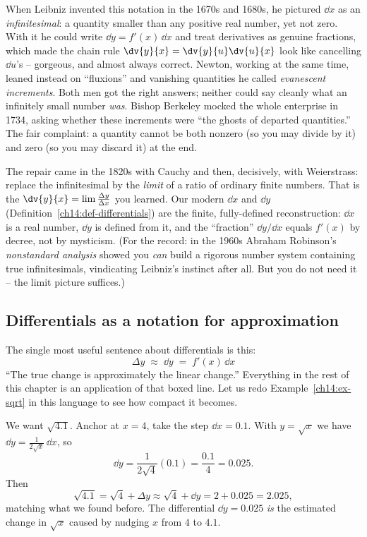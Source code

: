 \begin{historybox}
When Leibniz invented this notation in the 1670s and 1680s, he pictured $\dd x$ as
an \emph{infinitesimal}: a quantity smaller than any positive real number, yet not
zero. With it he could write $\dd y = f'(x)\,\dd x$ and treat derivatives as
genuine fractions, which made the chain rule $\dv{y}{x}=\dv{y}{u}\dv{u}{x}$ look
like cancelling $\dd u$'s -- gorgeous, and almost always correct. Newton,
working at the same time, leaned instead on ``fluxions'' and vanishing quantities
he called \emph{evanescent increments}. Both men got the right answers; neither
could say cleanly what an infinitely small number \emph{was}. Bishop Berkeley
mocked the whole enterprise in 1734, asking whether these increments were ``the
ghosts of departed quantities.'' The fair complaint: a quantity cannot be both
nonzero (so you may divide by it) and zero (so you may discard it) at the end.

The repair came in the 1820s with Cauchy and then, decisively, with Weierstrass:
replace the infinitesimal by the \emph{limit} of a ratio of ordinary finite
numbers. That is the $\dv{y}{x}=\lim \frac{\Delta y}{\Delta x}$ you learned. Our
modern $\dd x$ and $\dd y$ (Definition~\ref{ch14:def-differentials}) are the
finite, fully-defined reconstruction: $\dd x$ is a real number, $\dd y$ is defined
from it, and the ``fraction'' $\dd y/\dd x$ equals $f'(x)$ by decree, not by
mysticism. (For the record: in the 1960s Abraham Robinson's \emph{nonstandard
analysis} showed you \emph{can} build a rigorous number system containing true
infinitesimals, vindicating Leibniz's instinct after all. But you do not need it
-- the limit picture suffices.)
\end{historybox}

\subsection{Differentials as a notation for approximation}

The single most useful sentence about differentials is this:
\[
\boxed{\;\Delta y \;\approx\; \dd y \;=\; f'(x)\,\dd x\;}
\]
``The true change is approximately the linear change.'' Everything in the rest of
this chapter is an application of that boxed line. Let us redo
Example~\ref{ch14:ex-sqrt} in this language to see how compact it becomes.

\begin{example}
\label{ch14:ex-sqrt-diff}
We want $\sqrt{4.1}$. Anchor at $x=4$, take the step $\dd x = 0.1$. With
$y=\sqrt{x}$ we have $\dd y = \frac{1}{2\sqrt{x}}\,\dd x$, so
\[
\dd y = \frac{1}{2\sqrt 4}(0.1) = \frac{0.1}{4} = 0.025.
\]
Then
\[
\sqrt{4.1} = \sqrt 4 + \Delta y \approx \sqrt 4 + \dd y = 2 + 0.025 = 2.025,
\]
matching what we found before. The differential $\dd y=0.025$ \emph{is} the
estimated change in $\sqrt{x}$ caused by nudging $x$ from $4$ to $4.1$.
\end{example}

